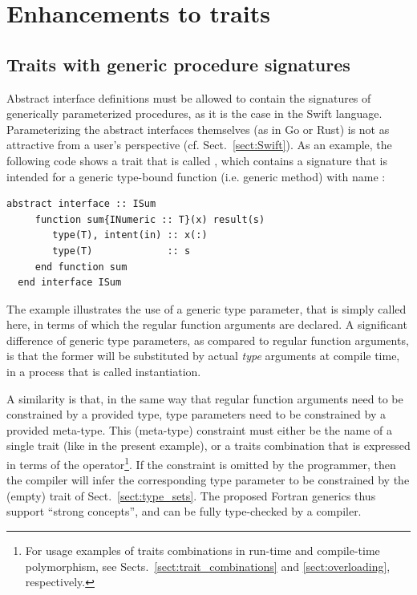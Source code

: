 \documentclass[11pt,oneside]{report}
\newcommand{\code}[1]{{\selectfont\ttfamily{#1}}}
\begin{document}
\section{Enhancements to traits}
\label{sect:interface_enhancements}

\subsection{Traits with generic procedure signatures} 
\label{sect:generic_interfaces}

Abstract interface definitions must be allowed to contain the
signatures of generically parameterized procedures, as it is the case
in the Swift language. Parameterizing the abstract interfaces
themselves (as in Go or Rust) is not as attractive from a user's
perspective (cf. Sect.~\ref{sect:Swift}). As an example, the following
code shows a trait that is called \code{ISum}, which contains a
signature that is intended for a generic type-bound function
(i.e. generic method) with name \code{sum}:
\begin{lstlisting}[language=LFortran,style=boxed]
  abstract interface :: ISum
     function sum{INumeric :: T}(x) result(s)
        type(T), intent(in) :: x(:)
        type(T)             :: s
     end function sum
  end interface ISum
\end{lstlisting}

The example illustrates the use of a generic type parameter, that is
simply called \code{T} here, in terms of which the regular function
arguments are declared. A significant difference of generic type
parameters, as compared to regular function arguments, is that the
former will be substituted by actual \emph{type} arguments at compile
time, in a process that is called instantiation.

A similarity is that, in the same way that regular function arguments
need to be constrained by a provided type, type parameters need to be
constrained by a provided meta-type. This (meta-type) constraint must
either be the name of a single trait (like \code{INumeric} in the
present example), or a traits combination that is expressed in terms
of the \code{+} operator\footnote{For usage examples of traits
combinations in run-time and compile-time polymorphism, see
Sects.~\ref{sect:trait_combinations} and \ref{sect:overloading},
respectively.}. If the constraint is omitted by the programmer, then
the compiler will infer the corresponding type parameter to be
constrained by the \code{AnyType} (empty) trait of
Sect.~\ref{sect:type_sets}. The proposed Fortran generics thus support
``strong concepts'', and can be fully type-checked by a compiler.
\end{document}

